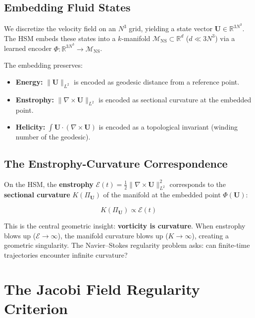 \documentclass{article}
\begin{document}
\subsection{Embedding Fluid States}

We discretize the velocity field on an $N^3$ grid, yielding a state vector
$\mathbf{U} \in \mathbb{R}^{3N^3}$.  The HSM embeds these states into a
$k$-manifold $\mathcal{M}_{\text{NS}} \subset \mathbb{R}^d$ ($d \ll 3N^3$)
via a learned encoder $\Phi: \mathbb{R}^{3N^3} \to \mathcal{M}_{\text{NS}}$.

The embedding preserves:
\begin{itemize}
  \item \textbf{Energy:} $\|\mathbf{U}\|_{L^2}$ is encoded as geodesic
    distance from a reference point.
  \item \textbf{Enstrophy:} $\|\nabla \times \mathbf{U}\|_{L^2}$ is encoded
    as sectional curvature at the embedded point.
  \item \textbf{Helicity:} $\int \mathbf{U} \cdot (\nabla \times \mathbf{U})$
    is encoded as a topological invariant (winding number of the geodesic).
\end{itemize}

\subsection{The Enstrophy-Curvature Correspondence}

On the HSM, the \textbf{enstrophy} $\mathcal{E}(t) = \frac{1}{2}\|\nabla \times
\mathbf{U}\|_{L^2}^2$ corresponds to the \textbf{sectional curvature}
$K(\Pi_{\mathbf{U}})$ of the manifold at the embedded point $\Phi(\mathbf{U})$:

\begin{equation}
K(\Pi_{\mathbf{U}}) \propto \mathcal{E}(t)
\end{equation}

This is the central geometric insight: \textbf{vorticity is curvature}.
When enstrophy blows up ($\mathcal{E} \to \infty$), the manifold curvature
blows up ($K \to \infty$), creating a geometric singularity.  The Navier--Stokes
regularity problem asks: can finite-time trajectories encounter infinite
curvature?

\section{The Jacobi Field Regularity Criterion}
\label{sec:jacobi}
\end{document}
